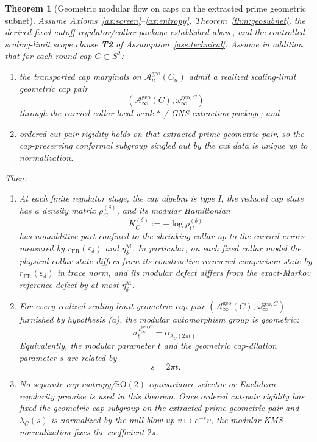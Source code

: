 \documentclass[11pt]{article}
\newtheorem{theorem}{Theorem}[section]
\begin{document}
\begin{theorem}[Geometric modular flow on caps on the extracted prime geometric subnet]\label{thm:bw}
Assume Axioms~\ref{ax:screen}--\ref{ax:entropy}, Theorem~\ref{thm:geosubnet}, the derived fixed-cutoff regulator/collar package established above, and the controlled scaling-limit scope clause \textbf{T2} of Assumption~\ref{ass:technical}. Assume in addition that for each round cap \(C\subset S^2\):
\begin{enumerate}[label=\textup{(\alph*)},leftmargin=2em]
\item the transported cap marginals on \(\mathcal A_n^{\mathrm{geo}}(C_n)\) admit a realized scaling-limit geometric cap pair
\[
(\mathcal A_\infty^{\mathrm{geo}}(C),\omega_\infty^{\mathrm{geo},C})
\]
through the carried-collar local weak-\(*\) / GNS extraction package; and
\item ordered cut-pair rigidity holds on that extracted prime geometric pair, so the cap-preserving conformal subgroup singled out by the cut data is unique up to normalization.
\end{enumerate}
Then:
\begin{enumerate}[label=\textup{(\roman*)},leftmargin=2em]
\item At each finite regulator stage, the cap algebra is type I, the reduced cap state has a density matrix \(\rho_C^{(\delta)}\), and its modular Hamiltonian
\[
K_C^{(\delta)}:=-\log \rho_C^{(\delta)}
\]
has nonadditive part confined to the shrinking collar up to the carried errors measured by \(r_{\mathrm{FR}}(\varepsilon_\delta)\) and \(\eta_\delta^{\mathrm M}\). In particular, on each fixed collar model the physical collar state differs from its constructive recovered comparison state by \(r_{\mathrm{FR}}(\varepsilon_\delta)\) in trace norm, and its modular defect differs from the exact-Markov reference defect by at most \(\eta_\delta^{\mathrm M}\).

\item For every realized scaling-limit geometric cap pair \((\mathcal A_\infty^{\mathrm{geo}}(C),\omega_\infty^{\mathrm{geo},C})\) furnished by hypothesis \textup{(a)}, the modular automorphism group is geometric:
\[
\sigma_t^{\omega_\infty^{\mathrm{geo},C}}
=
\alpha_{\lambda_C(2\pi t)}.
\]
Equivalently, the modular parameter \(t\) and the geometric cap-dilation parameter \(s\) are related by
\[
s=2\pi t.
\]

\item No separate cap-isotropy/\(\mathrm{SO}(2)\)-equivariance selector or Euclidean-regularity premise is used in this theorem. Once ordered cut-pair rigidity has fixed the geometric cap subgroup on the extracted prime geometric pair and \(\lambda_C(s)\) is normalized by the null blow-up \(v\mapsto e^{-s}v\), the modular KMS normalization fixes the coefficient \(2\pi\).


\end{enumerate}
\end{theorem}
\end{document}
